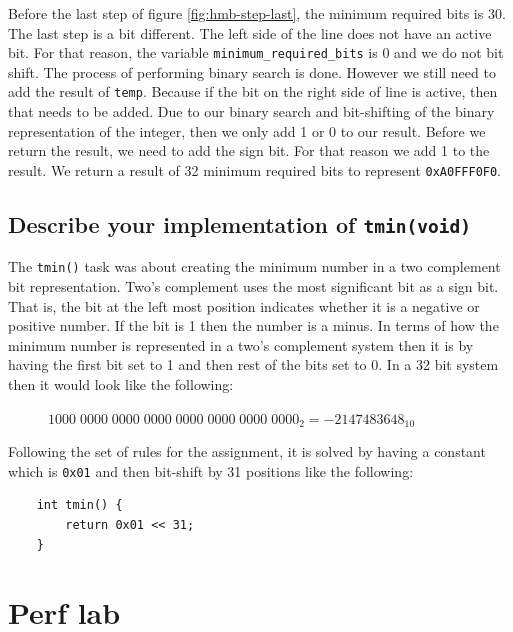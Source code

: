 \documentclass[11pt]{article}
\newcommand{\code}[1]{{\colorbox{lightgray!15}{\color{black}\texttt{#1}}}}
\begin{document}
Before the last step of figure \ref{fig:hmb-step-last}, the minimum required bits is 30. The last step is a bit different. The left side of the line does not have an active bit.
For that reason, the variable \code{minimum\_required\_bits} is 0 and we do not bit shift.
The process of performing binary search is done. However we still need to add the result of \code{temp}. Because if the bit on the right side of line is active, then that needs to be added.
Due to our binary search and bit-shifting of the binary representation of the integer, then we only add 1 or 0 to our result. 
Before we return the result, we need to add the sign bit. For that reason we add 1 to the result. We return a result of 32 minimum required bits to represent \code{0xA0FFF0F0}.

\subsection{Describe your implementation of \code{tmin(void)}}
The \code{tmin()} task was about creating the minimum number in a two complement bit representation.
Two's complement uses the most significant bit as a sign bit. That is, the bit at the left most position indicates whether 
it is a negative or positive number. If the bit is 1 then the number is a minus. 
In terms of how the minimum number is represented in a two's complement system then it is by having the first bit set to 1 and then rest of the bits set to 0.
In a 32 bit system then it would look like the following:

\begin{figure}[h]
    $1000 \; 0000 \; 0000 \; 0000 \; 0000 \; 0000 \; 0000 \; 0000_2 = -2147483648_{10}$
    \centering
\end{figure}


Following the set of rules for the assignment, it is solved by having a constant which is \code{0x01}
and then bit-shift by 31 positions like the following:
\begin{lstlisting}
    int tmin() {
        return 0x01 << 31;
    }
\end{lstlisting}


\section{Perf lab}
\end{document}
